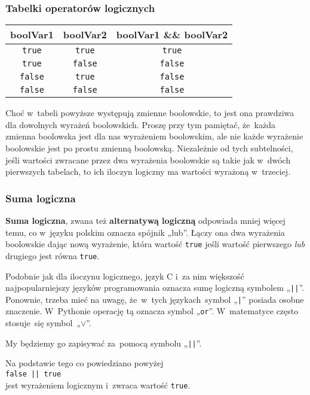 \documentclass[10pt,t]{beamer}
\begin{document}
\begin{frame}
  \frametitle{Tabelki operatorów logicznych}


  \begingroup

  \centering

  \begin{tabular}{|c|c|c|}
    \hline
    boolVar1 & boolVar2 & boolVar1 \&\& boolVar2 \\
    \hline
    \texttt{true}  & \texttt{true}  & \texttt{true}  \\
    \texttt{true}  & \texttt{false} & \texttt{false} \\
    \texttt{false} & \texttt{true}  & \texttt{false} \\
    \texttt{false} & \texttt{false} & \texttt{false} \\
    \hline
  \end{tabular}

  \endgroup

  \vspace{1em}





  Choć w~tabeli powyższe występują zmienne boolowskie, to jest ona
  prawdziwa dla dowolnych wyrażeń boolowskich. Proszę przy tym pamiętać,
  że~każda zmienna boolowska jest dla nas wyrażeniem boolowskim, ale nie
  każde wyrażenie boolowskie jest po prostu zmienną boolowską. Niezależnie
  od tych subtelności, jeśli wartości zwracane przez dwa wyrażenia
  boolowskie są takie jak w~dwóch pierwszych tabelach, to ich iloczyn
  logiczny ma wartości wyrażoną w~trzeciej.

\end{frame}





\begin{frame}
  \frametitle{Suma logiczna}


  \textbf{Suma logiczna}, zwana też \textbf{alternatywą logiczną} odpowiada
  mniej więcej temu, co w~języku polskim oznacza spójnik „lub”. Łączy ona
  dwa wyrażenia boolowskie dając nową wyrażenie, która wartość \texttt{true}
  jeśli wartość pierwszego \textit{lub} drugiego jest równa \texttt{true}.

  Podobnie jak dla iloczynu logicznego, język C i~za nim większość
  najpopularniejszy języków programowania oznacza sumę logiczną symbolem
  „\texttt{||}”. Ponownie, trzeba mieć na uwagę, że~w~tych językach~symbol
  „\texttt{|}” posiada osobne znaczenie. W~Pythonie operację tą oznacza
  symbol „\texttt{or}”. W~matematyce często stosuje~się symbol~„$\vee$”.

  My będziemy go zapisywać za~pomocą symbolu „\texttt{||}”.

  Na podstawie tego co powiedziano powyżej \\
  \texttt{false || true} \\
  jest wyrażeniem logicznym i~zwraca wartość \texttt{true}.

\end{frame}
\end{document}
